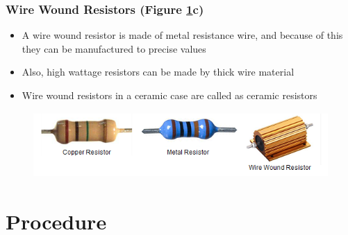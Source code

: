 		\subsubsection{Wire Wound Resistors (Figure \ref{fig:typesOfResistors2}c)}
			\begin{itemize}
				\tightlist
				\item A wire wound resistor is made of metal resistance wire, and because of this they can be manufactured to precise values
				\item Also, high wattage resistors can be made by thick wire material
				\item Wire wound resistors in a ceramic case are called as ceramic resistors
			\end{itemize}
		\begin{figure}[h]
			\centering
			\includegraphics[height=2.5cm]{img/exp1/fig5}
			\caption[Types of Resistor]{}
			\label{fig:typesOfResistors2}
		\end{figure}


\section{Procedure}
